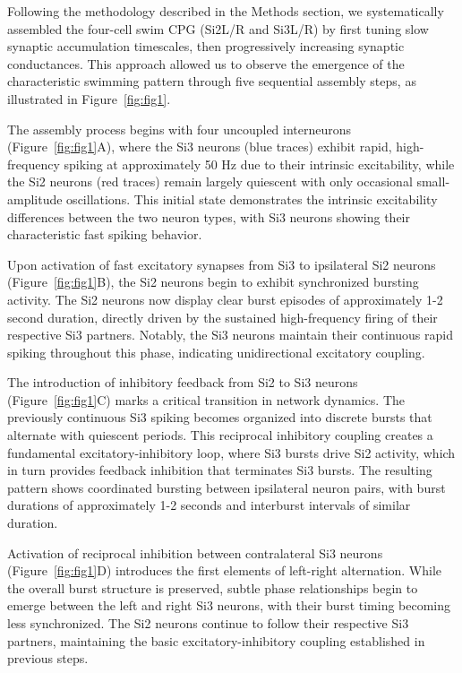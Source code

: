 \documentclass[nofootinbib,aip,amsmath,amssymb,reprint,twocolumn,10pt]{revtex4-2}
\begin{document}
Following the methodology described in the Methods section, we systematically assembled the four-cell swim CPG (Si2L/R and Si3L/R) by first tuning slow synaptic accumulation timescales, then progressively increasing synaptic conductances. This approach allowed us to observe the emergence of the characteristic swimming pattern through five sequential assembly steps, as illustrated in Figure~\ref{fig:fig1}.

The assembly process begins with four uncoupled interneurons (Figure~\ref{fig:fig1}A), where the Si3 neurons (blue traces) exhibit rapid, high-frequency spiking at approximately 50 Hz due to their intrinsic excitability, while the Si2 neurons (red traces) remain largely quiescent with only occasional small-amplitude oscillations. This initial state demonstrates the intrinsic excitability differences between the two neuron types, with Si3 neurons showing their characteristic fast spiking behavior.

Upon activation of fast excitatory synapses from Si3 to ipsilateral Si2 neurons (Figure~\ref{fig:fig1}B), the Si2 neurons begin to exhibit synchronized bursting activity. The Si2 neurons now display clear burst episodes of approximately 1-2 second duration, directly driven by the sustained high-frequency firing of their respective Si3 partners. Notably, the Si3 neurons maintain their continuous rapid spiking throughout this phase, indicating unidirectional excitatory coupling.

The introduction of inhibitory feedback from Si2 to Si3 neurons (Figure~\ref{fig:fig1}C) marks a critical transition in network dynamics. The previously continuous Si3 spiking becomes organized into discrete bursts that alternate with quiescent periods. This reciprocal inhibitory coupling creates a fundamental excitatory-inhibitory loop, where Si3 bursts drive Si2 activity, which in turn provides feedback inhibition that terminates Si3 bursts. The resulting pattern shows coordinated bursting between ipsilateral neuron pairs, with burst durations of approximately 1-2 seconds and interburst intervals of similar duration.

Activation of reciprocal inhibition between contralateral Si3 neurons (Figure~\ref{fig:fig1}D) introduces the first elements of left-right alternation. While the overall burst structure is preserved, subtle phase relationships begin to emerge between the left and right Si3 neurons, with their burst timing becoming less synchronized. The Si2 neurons continue to follow their respective Si3 partners, maintaining the basic excitatory-inhibitory coupling established in previous steps.
\end{document}
